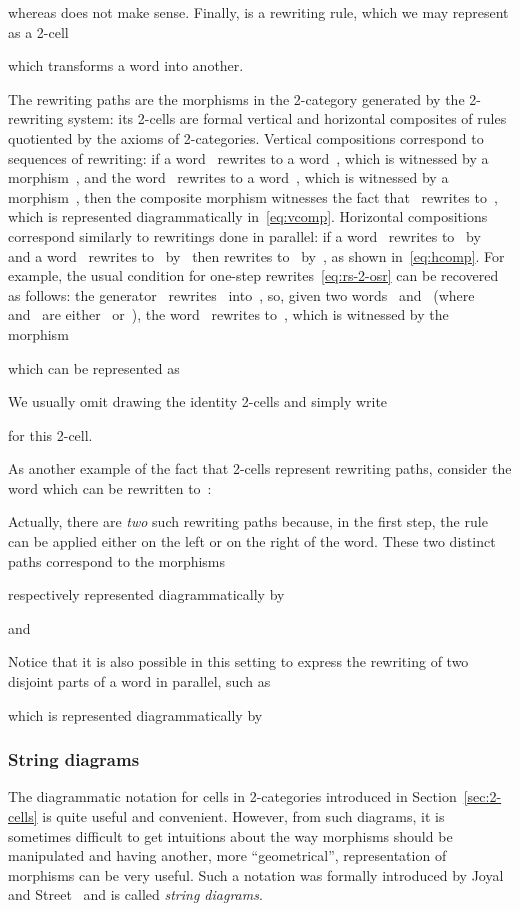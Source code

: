 \documentclass{LMCS}
\begin{document}
whereas  does not make sense. Finally,  is a rewriting rule,
which we may represent as a 2-cell

which transforms a word into another.

The rewriting paths are the morphisms in the 2-category generated by the
2-rewriting system: its 2-cells are formal vertical and horizontal composites of
rules quotiented by the axioms of 2-categories. Vertical compositions correspond
to sequences of rewriting: if a word~ rewrites to a word~, which is
witnessed by a morphism~, and the word~ rewrites to a
word~, which is witnessed by a morphism~, then the composite
morphism  witnesses the fact that~ rewrites to~,
which is represented diagrammatically in~\eqref{eq:vcomp}. Horizontal
compositions correspond similarly to rewritings done in parallel: if a word~
rewrites to~ by~ and a word~ rewrites to~
by~ then  rewrites to~
by~, as shown in~\eqref{eq:hcomp}. For example, the usual
condition for one-step rewrites~\eqref{eq:rs-2-osr} can be recovered as follows:
the generator~ rewrites~ into~, so, given two words~
and~ (where~ and~ are either~ or~), the word~
rewrites to~, which is witnessed by the morphism

which can be represented as

We usually omit drawing the identity 2-cells and simply write

for this 2-cell.

As another example of the fact that 2-cells represent rewriting paths, consider
the word  which can be rewritten to~:

Actually, there are \emph{two} such rewriting paths because, in the first step,
the rule~ can be applied either on the left or on the right of the
word. These two distinct paths correspond to the morphisms

respectively represented diagrammatically by

and

Notice that it is also possible in this setting to express the rewriting of two
disjoint parts of a word in parallel, such as

which is represented diagrammatically by




\subsubsection{String diagrams}
The diagrammatic notation for cells in 2-categories introduced in
Section~\ref{sec:2-cells} is quite useful and convenient. However, from such diagrams,
it is sometimes difficult to get intuitions about the way morphisms should be
manipulated and having another, more ``geometrical'', representation of
morphisms can be very useful. Such a notation was formally introduced by Joyal
and Street~\cite{joyal-street:geometry-tensor-calculus} and is called
\emph{string diagrams}.
\end{document}

